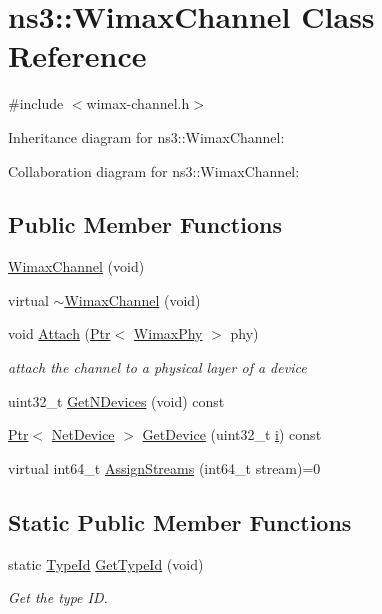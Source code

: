 \hypertarget{classns3_1_1WimaxChannel}{}\section{ns3\+:\+:Wimax\+Channel Class Reference}
\label{classns3_1_1WimaxChannel}


{\ttfamily \#include $<$wimax-\/channel.\+h$>$}



Inheritance diagram for ns3\+:\+:Wimax\+Channel\+:


Collaboration diagram for ns3\+:\+:Wimax\+Channel\+:
\subsection*{Public Member Functions}
\begin{DoxyCompactItemize}
\item 
\hyperlink{classns3_1_1WimaxChannel_a37e74b8f7c7825ac74a316000fdb85df}{Wimax\+Channel} (void)
\item 
virtual \hyperlink{classns3_1_1WimaxChannel_adf5412483052b7e696aba47efe57504e}{$\sim$\+Wimax\+Channel} (void)
\item 
void \hyperlink{classns3_1_1WimaxChannel_a4cf9305ed2aae148df9a7f897f9b56bc}{Attach} (\hyperlink{classns3_1_1Ptr}{Ptr}$<$ \hyperlink{classns3_1_1WimaxPhy}{Wimax\+Phy} $>$ phy)
\begin{DoxyCompactList}\small\item\em attach the channel to a physical layer of a device \end{DoxyCompactList}\item 
uint32\+\_\+t \hyperlink{classns3_1_1WimaxChannel_a0a5be7c65bdf00cefdace0a434c4956f}{Get\+N\+Devices} (void) const 
\item 
\hyperlink{classns3_1_1Ptr}{Ptr}$<$ \hyperlink{classns3_1_1NetDevice}{Net\+Device} $>$ \hyperlink{classns3_1_1WimaxChannel_a146673e35d078c53a4c325e3caaa1223}{Get\+Device} (uint32\+\_\+t \hyperlink{lte__uplink__power__control_8m_a6f6ccfcf58b31cb6412107d9d5281426}{i}) const 
\item 
virtual int64\+\_\+t \hyperlink{classns3_1_1WimaxChannel_a4ca5086ac5a6b3bb676f1537dea4039a}{Assign\+Streams} (int64\+\_\+t stream)=0
\end{DoxyCompactItemize}
\subsection*{Static Public Member Functions}
\begin{DoxyCompactItemize}
\item 
static \hyperlink{classns3_1_1TypeId}{Type\+Id} \hyperlink{classns3_1_1WimaxChannel_af4c702e5b6c3c6ce41999686dcd8a905}{Get\+Type\+Id} (void)
\begin{DoxyCompactList}\small\item\em Get the type ID. \end{DoxyCompactList}\end{DoxyCompactItemize}
